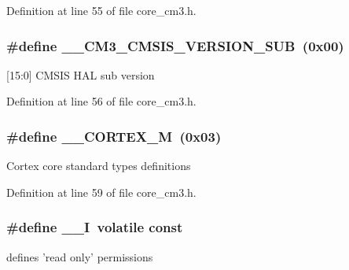 \-Definition at line 55 of file core\-\_\-cm3.\-h.

\hypertarget{group___c_m_s_i_s__core__definitions_ga9ff7a998d4b8b3c87bfaca6e78607950}{
\subsubsection[{\-\_\-\-\_\-\-C\-M3\-\_\-\-C\-M\-S\-I\-S\-\_\-\-V\-E\-R\-S\-I\-O\-N\-\_\-\-S\-U\-B}]{\setlength{\rightskip}{0pt plus 5cm}\#define {\bf \-\_\-\-\_\-\-C\-M3\-\_\-\-C\-M\-S\-I\-S\-\_\-\-V\-E\-R\-S\-I\-O\-N\-\_\-\-S\-U\-B}~(0x00)}}\label{group___c_m_s_i_s__core__definitions_ga9ff7a998d4b8b3c87bfaca6e78607950}
\mbox{[}15\-:0\mbox{]} \-C\-M\-S\-I\-S \-H\-A\-L sub version 

\-Definition at line 56 of file core\-\_\-cm3.\-h.

\hypertarget{group___c_m_s_i_s__core__definitions_ga63ea62503c88acab19fcf3d5743009e3}{
\subsubsection[{\-\_\-\-\_\-\-C\-O\-R\-T\-E\-X\-\_\-\-M}]{\setlength{\rightskip}{0pt plus 5cm}\#define {\bf \-\_\-\-\_\-\-C\-O\-R\-T\-E\-X\-\_\-\-M}~(0x03)}}\label{group___c_m_s_i_s__core__definitions_ga63ea62503c88acab19fcf3d5743009e3}
\-Cortex core standard types definitions 

\-Definition at line 59 of file core\-\_\-cm3.\-h.

\hypertarget{group___c_m_s_i_s__core__definitions_gaf63697ed9952cc71e1225efe205f6cd3}{
\subsubsection[{\-\_\-\-\_\-\-I}]{\setlength{\rightskip}{0pt plus 5cm}\#define {\bf \-\_\-\-\_\-\-I}~volatile const}}\label{group___c_m_s_i_s__core__definitions_gaf63697ed9952cc71e1225efe205f6cd3}
defines 'read only' permissions 

